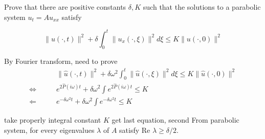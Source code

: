 \exc Prove that there are positive
 constants $\delta , K$ such that the
 solutions to a
parabolic system $u_t = Au_{xx}$ satisfy

\[\| u (\cdot, t)\|^2 +\delta \int_0^t \|u_x 
(\cdot, \xi) \|^2 d\xi \leq K \|u(\cdot, 0)\|^2\]


\begin{solution}
    By Fourier transform, need to prove
    \begin{align*}
      &\| \hat{u} (\cdot, t)\|^2 + \delta \omega^2 \int_0^t \| \hat{u} (\cdot, \xi) \|^2 d\xi \leq K \|\hat{u}(\cdot, 0)\|^2 \\
    \Longleftrightarrow \qquad
     & 
     e^{2\hat{P}(i\omega)t} + \delta \omega^2 
     \int e^{2\hat{P}(i\omega)t}  \leq K \\
     \Longleftarrow \qquad 
     & e^{-\delta \omega^2t} +  \delta \omega^2 \int 
     e^{-\delta \omega^2t} \leq K
    \end{align*}
    
    take properly integral constant $K$ get last equation, 
    second From parabolic system, for every eigenvalues
    $\lambda$ of $A$ satisfy Re $\lambda \geq \delta / 2$.

\end{solution}